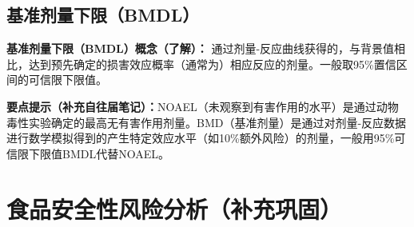 \subsection{基准剂量下限（BMDL）}

\begin{defbox}
\textbf{基准剂量下限（BMDL）概念（了解）：}
通过剂量-反应曲线获得的，与背景值相比，达到预先确定的损害效应概率（通常为）相应反应的剂量。一般取95\%置信区间的可信限下限值。
\end{defbox}

\begin{tipbox}
\textbf{要点提示（补充自往届笔记）：}NOAEL（未观察到有害作用的水平）是通过动物毒性实验确定的最高无有害作用剂量。BMD（基准剂量）是通过对剂量-反应数据进行数学模拟得到的产生特定效应水平（如10\%额外风险）的剂量，一般用95\%可信限下限值BMDL代替NOAEL。
\end{tipbox}

\section{食品安全性风险分析（补充巩固）}

